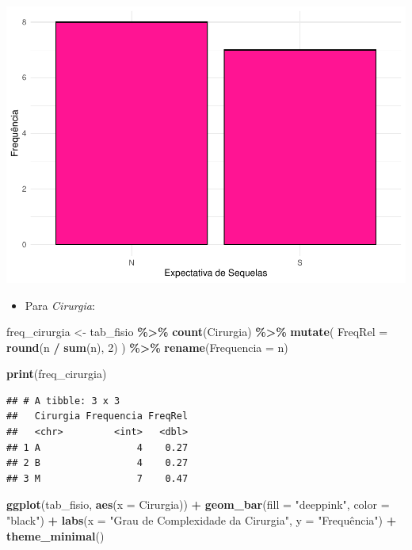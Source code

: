 \documentclass[
]{book}
\newenvironment{Shaded}{\begin{snugshade}}{\end{snugshade}}
\newcommand{\AttributeTok}[1]{\textcolor[rgb]{0.13,0.29,0.53}{#1}}
\newcommand{\DecValTok}[1]{\textcolor[rgb]{0.00,0.00,0.81}{#1}}
\newcommand{\FunctionTok}[1]{\textcolor[rgb]{0.13,0.29,0.53}{\textbf{#1}}}
\newcommand{\NormalTok}[1]{#1}
\newcommand{\OtherTok}[1]{\textcolor[rgb]{0.56,0.35,0.01}{#1}}
\newcommand{\SpecialCharTok}[1]{\textcolor[rgb]{0.81,0.36,0.00}{\textbf{#1}}}
\newcommand{\StringTok}[1]{\textcolor[rgb]{0.31,0.60,0.02}{#1}}
\providecommand{\tightlist}{%
  \setlength{\itemsep}{0pt}\setlength{\parskip}{0pt}}
\begin{document}
\begin{center}\includegraphics{AED_files/figure-latex/cap6_ex1bs-1} \end{center}

\begin{itemize}
\tightlist
\item
  Para \emph{Cirurgia}:
\end{itemize}

\begin{Shaded}
\begin{Highlighting}[]
\NormalTok{freq\_cirurgia }\OtherTok{\textless{}{-}}\NormalTok{ tab\_fisio }\SpecialCharTok{\%\textgreater{}\%}
  \FunctionTok{count}\NormalTok{(Cirurgia) }\SpecialCharTok{\%\textgreater{}\%}
  \FunctionTok{mutate}\NormalTok{(}
    \AttributeTok{FreqRel =} \FunctionTok{round}\NormalTok{(n }\SpecialCharTok{/} \FunctionTok{sum}\NormalTok{(n), }\DecValTok{2}\NormalTok{)}
\NormalTok{  ) }\SpecialCharTok{\%\textgreater{}\%}
  \FunctionTok{rename}\NormalTok{(}\AttributeTok{Frequencia =}\NormalTok{ n)}

\FunctionTok{print}\NormalTok{(freq\_cirurgia)}
\end{Highlighting}
\end{Shaded}

\begin{verbatim}
## # A tibble: 3 x 3
##   Cirurgia Frequencia FreqRel
##   <chr>         <int>   <dbl>
## 1 A                 4    0.27
## 2 B                 4    0.27
## 3 M                 7    0.47
\end{verbatim}

\begin{Shaded}
\begin{Highlighting}[]
\FunctionTok{ggplot}\NormalTok{(tab\_fisio, }\FunctionTok{aes}\NormalTok{(}\AttributeTok{x =}\NormalTok{ Cirurgia)) }\SpecialCharTok{+}
  \FunctionTok{geom\_bar}\NormalTok{(}\AttributeTok{fill =} \StringTok{"deeppink"}\NormalTok{, }\AttributeTok{color =} \StringTok{"black"}\NormalTok{) }\SpecialCharTok{+}
  \FunctionTok{labs}\NormalTok{(}\AttributeTok{x =} \StringTok{"Grau de Complexidade da Cirurgia"}\NormalTok{, }\AttributeTok{y =} \StringTok{"Frequência"}\NormalTok{) }\SpecialCharTok{+}
  \FunctionTok{theme\_minimal}\NormalTok{()}
\end{Highlighting}
\end{Shaded}
\end{document}
